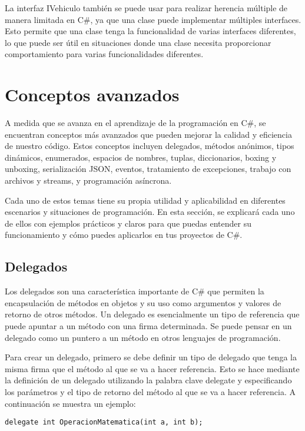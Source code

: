 \documentclass[executivepaper]{article}
\begin{document}
La interfaz IVehiculo también se puede usar para realizar herencia múltiple de manera limitada en C\#, ya que una clase puede implementar múltiples interfaces. Esto permite que una clase tenga la funcionalidad de varias interfaces diferentes, lo que puede ser útil en situaciones donde una clase necesita proporcionar comportamiento para varias funcionalidades diferentes.

\newpage
\section{Conceptos avanzados}

A medida que se avanza en el aprendizaje de la programación en C\#, se encuentran conceptos más avanzados que pueden mejorar la calidad y eficiencia de nuestro código. Estos conceptos incluyen delegados, métodos anónimos, tipos dinámicos, enumerados, espacios de nombres, tuplas, diccionarios, boxing y unboxing, serialización JSON, eventos, tratamiento de excepciones, trabajo con archivos y streams, y programación asíncrona.

Cada uno de estos temas tiene su propia utilidad y aplicabilidad en diferentes escenarios y situaciones de programación. En esta sección, se explicará cada uno de ellos con ejemplos prácticos y claros para que puedas entender su funcionamiento y cómo puedes aplicarlos en tus proyectos de C\#.

\subsection{Delegados}

Los delegados son una característica importante de C\# que permiten la encapsulación de métodos en objetos y su uso como argumentos y valores de retorno de otros métodos. Un delegado es esencialmente un tipo de referencia que puede apuntar a un método con una firma determinada. Se puede pensar en un delegado como un puntero a un método en otros lenguajes de programación.

Para crear un delegado, primero se debe definir un tipo de delegado que tenga la misma firma que el método al que se va a hacer referencia. Esto se hace mediante la definición de un delegado utilizando la palabra clave delegate y especificando los parámetros y el tipo de retorno del método al que se va a hacer referencia. A continuación se muestra un ejemplo:

\begin{lstlisting}
delegate int OperacionMatematica(int a, int b);
\end{lstlisting}
\end{document}

